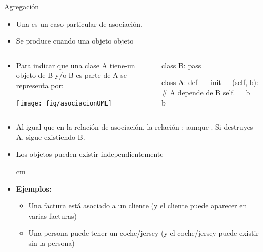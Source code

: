 \documentclass[10pt,envcountsect,spanish]{beamer}
\begin{document}
\begin{frame}[fragile]{Agregación} 

\begin{itemize}
\item Una  es un caso particular de asociación.
\item Se produce cuando una objeto  objeto 
\end{itemize}

\begin{columns}
\begin{column}{.49\textwidth}
\begin{itemize}

\item Para indicar que una clase A tiene-un objeto de B y/o B es parte de A se representa por:
\centerline{\texttt{[image: fig/asociacionUML]}}
\end{itemize}

\end{column}
\begin{column}{.41\textwidth}
 \scriptsize
\begin{pyconsole}[][frame=single]
class B:
    pass
    
class A:
    def __init__(self, b):
        # A depende de B
        self.__b = b  

\end{pyconsole}

\end{column}
\end{columns}

\begin{itemize}

\item Al igual que en la relación de asociación, la relación : aunque . Si destruyes A, sigue existiendo B. 
\item Los objetos pueden existir independientemente

 cm


\item \textbf{Ejemplos:} \it \small
\begin{itemize}
\item Una factura está asociado a un cliente (y el cliente puede aparecer en varias facturas)

\item Una persona puede tener un coche/jersey (y el coche/jersey puede existir sin la persona)


\end{itemize}
\end{itemize}
\end{frame}
\end{document}
